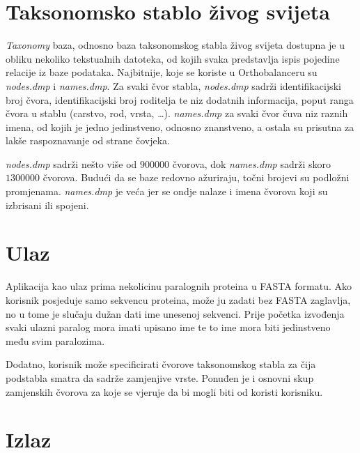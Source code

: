 \section{Taksonomsko stablo živog svijeta}
\label{sec:taxdb}

\emph{Taxonomy} baza, odnosno baza taksonomskog stabla živog svijeta
dostupna je u obliku nekoliko tekstualnih datoteka, od kojih svaka predstavlja
ispis pojedine relacije iz baze podataka. Najbitnije, koje se koriste u
Orthobalanceru su \emph{nodes.dmp} i \emph{names.dmp}. Za svaki čvor stabla,
\emph{nodes.dmp} sadrži identifikacijski broj čvora, identifikacijski broj
roditelja te niz dodatnih informacija, poput ranga čvora u stablu (carstvo,
rod, vrsta, \ldots). \emph{names.dmp} za svaki čvor čuva niz raznih imena, od
kojih je jedno jedinstveno, odnosno znanstveno, a ostala su prisutna za lakše
raspoznavanje od strane čovjeka.

\begin{sloppypar}

\emph{nodes.dmp} sadrži nešto više od $900000$ čvorova, dok \emph{names.dmp}
sadrži skoro $1300000$ čvorova. Budući da se baze redovno ažuriraju, točni
brojevi su podložni promjenama. \emph{names.dmp} je veća jer se ondje nalaze i
imena čvorova koji su izbrisani ili spojeni.

\end{sloppypar}


\section{Ulaz}
\label{sec:input}

Aplikacija kao ulaz prima nekolicinu paralognih proteina u FASTA formatu. Ako
korisnik posjeduje samo sekvencu proteina, može ju zadati bez FASTA zaglavlja,
no u tome je slučaju dužan dati ime unesenoj sekvenci. Prije početka izvođenja
svaki ulazni paralog mora imati upisano ime te to ime mora biti jedinstveno među
svim paralozima.

Dodatno, korisnik može specificirati čvorove taksonomskog stabla za čija
podstabla smatra da sadrže zamjenjive vrste. Ponuđen je i osnovni skup
zamjenskih čvorova za koje se vjeruje da bi mogli biti od koristi korisniku.


\section{Izlaz}
\label{sec:output}

